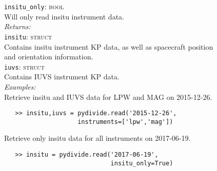 \documentclass{article}
\begin{document}
\indent \texttt{insitu\_only}: \textsc{bool}\\
\indent \indent Will only read insitu instrument data.\\
\textit{Returns:}\\
\indent \texttt{insitu}: \textsc{struct}\\
\indent \indent Contains insitu instrument KP data, as well as spacecraft position\\
\indent \indent and orientation information.\\
\indent \texttt{iuvs}: \textsc{struct}\\
\indent \indent Contains IUVS instrument KP data.\\
\noindent \textit{Examples:}\\
\indent Retrieve insitu and IUVS data for LPW and MAG on 2015-12-26.
\vspace{-5mm}
\begin{verbatim}
   >> insitu,iuvs = pydivide.read('2015-12-26',
                    instruments=['lpw','mag'])
\end{verbatim}
\indent \indent Retrieve only insitu data for all instruments on 2017-06-19.
\vspace{-5mm}
\begin{verbatim}
   >> insitu = pydivide.read('2017-06-19',
                             insitu_only=True)
\end{verbatim}

\newpage
\end{document}
